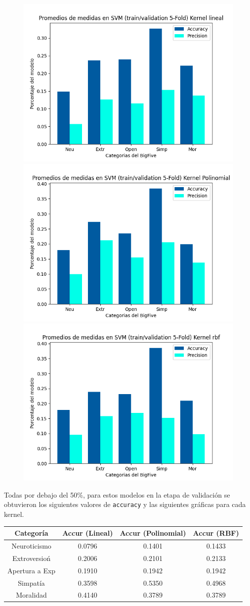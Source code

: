 \documentclass[10pt, a4paper]{article}
\begin{document}
            \begin{figure}[h!]
                \centering
                \includegraphics[width = 0.3\linewidth]{Medias_Lineal10.png}
                \includegraphics[width = 0.3\linewidth]{Medias_Polinomial10.png}
                \includegraphics[width = 0.3\linewidth]{Medias_rbf10.png}

            \end{figure}

            Todas por debajo del 50\%, para estos modelos en la etapa de validaci\'on se obtuvieron los 
            siguientes valores de \texttt{accuracy} y las siguientes gr\'aficas para cada kernel. \\ 

            \begin{tabular}[h!]{|c|c|c|c|}

                \hline Categor\'ia & Accur (Lineal) & Accur (Polinomial) & Accur (RBF) \\  
                \hline Neuroticismo             & 0.0796 & 0.1401  &  0.1433\\
                \hline Extroversio\'n           & 0.2006 & 0.2101  &  0.2133\\
                \hline Apertura a Exp  & 0.1910 & 0.1942  &  0.1942\\
                \hline Simpat\'ia               & 0.3598 & 0.5350  &  0.4968\\
                \hline Moralidad                & 0.4140 & 0.3789  &  0.3789\\
                \hline
            \end{tabular}
\end{document}

